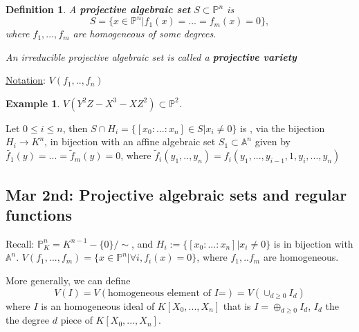 \documentclass[11pt]{article}
\newtheorem{dfn}[thm]{Definition}
\newtheorem{ex}[thm]{Example}
\newcommand{\affn}{\mathbb A}
\newcommand{\proj}{\mathbb P}
\newcommand{\lrta}{\longrightarrow}
\begin{document}
\begin{dfn}
 A  \textbf{projective algebraic set} $S\subset \proj^n$ is 
 $$
  S=\{ x\in \proj^n|f_1(x)=...=f_m(x)=0\},
 $$
 where $f_1,...,f_m$ are homogeneous of some degrees.

 An irreducible projective algebraic set is called a \textbf{projective variety}
\end{dfn}

\underline{Notation}: $V(f_1,..,f_n)$

\begin{ex}
$V(Y^2 Z-X^3-X Z^2)\subset \proj^2$. 
\end{ex}
Let $0\leq i\leq n$, then $S\cap H_i=\{[x_0:...:x_n]\in S| x_i\neq 0\}$ is , via the bijection  $H_i\lrta K^n$, in bijection with an affine algebraic set $S_1\subset \affn^n$ given by $\tilde{f_1}(y)=...=\tilde{f}_m(y)=0$, where $\tilde{f}_i(y_1,..,y_n)=f_i(y_1,...,y_{i-1},1, y_i,...,y_n)$


\subsection{Mar 2nd: Projective algebraic sets and regular functions}
Recall: $\proj^n_K=K^{n-1}-\{0\}/\sim$, and $H_i:=\{[x_0:...:x_n]|x_i\neq 0\}$ is in bijection with $\affn^n$. $V(f_1,...,f_m)=\{x\in \proj^n|\forall i,f_i(x)=0\}$, where $f_1,..f_m$ are homogeneous.

More generally, we can define 
$$
V(I)=V(\text{homogeneous element of $I$=})=V(\cup_{d\geq 0} I_d)
$$
where $I$ is an homogeneous ideal of $K[X_0,...,X_n]$ that is  $I=\oplus_{d\geq 0} I_d$, $I_d$ the the degree $d$ piece of $K[X_0,...,X_n]$.
\end{document}
